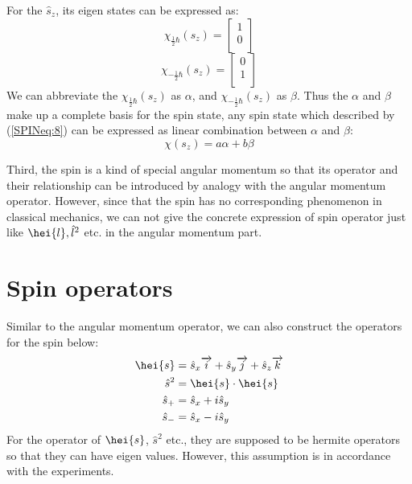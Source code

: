 For the $\hat{s}_{z}$, its eigen states can be expressed as:
\begin{equation}\label{}
\chi_{\frac{1}{2}\hbar}(s_{z}) = \begin{bmatrix}
                1 \\
                0 \\
              \end{bmatrix}
\end{equation}
\begin{equation}\label{}
\chi_{-\frac{1}{2}\hbar}(s_{z}) = \begin{bmatrix}
                0 \\
                1 \\
              \end{bmatrix}
\end{equation}
We can abbreviate the $\chi_{\frac{1}{2}\hbar}(s_{z})$ as $\alpha$,
and $\chi_{-\frac{1}{2}\hbar}(s_{z})$ as $\beta$. Thus the $\alpha$
and $\beta$ make up a complete basis for the spin state, any spin
state which described by (\ref{SPINeq:8}) can be expressed as linear
combination between $\alpha$ and $\beta$:
\begin{equation}\label{}
\chi(s_{z}) = a\alpha + b\beta
\end{equation}

Third, the spin is a kind of special angular momentum so that its
operator and their relationship can be introduced by analogy with
the angular momentum operator. However, since that the spin has no
corresponding phenomenon in classical mechanics, we can not give the
concrete expression of spin operator just like $\hei{l},
\hat{l}^{2}$ etc. in the angular momentum part.

\section{Spin operators}
%
%
Similar to the angular momentum operator, we can also construct the
operators for the spin below:
\begin{align}\label{SPINeq:2}
\hei{s} &= \hat{s}_{x}\overrightarrow{i} +
\hat{s}_{y}\overrightarrow{j} + \hat{s}_{z}\overrightarrow{k}
\nonumber \\
\hat{s}^{2} &= \hei{s}\cdot\hei{s} \nonumber \\
\hat{s}_{+} &= \hat{s}_{x} + i\hat{s}_{y}  \nonumber \\
\hat{s}_{-} &= \hat{s}_{x} - i\hat{s}_{y}
\end{align}
For the operator of $\hei{s}$, $\hat{s}^{2}$ etc., they are supposed
to be hermite operators so that they can have eigen values. However,
this assumption is in accordance with the experiments.


